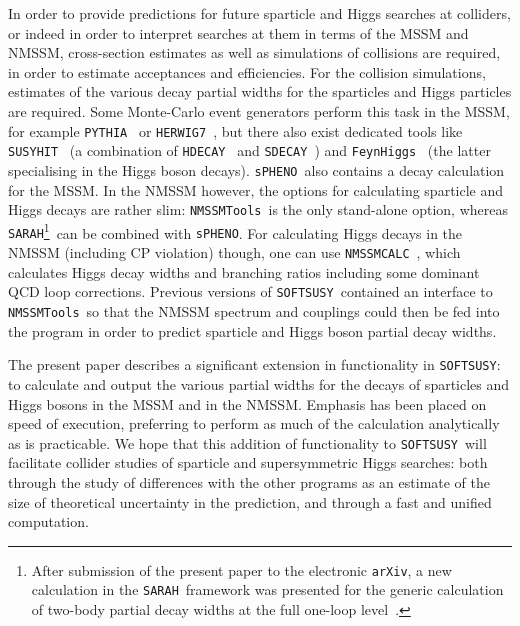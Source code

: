 \documentclass[final,3p,times]{elsarticle}
\def\code#1{{\tt #1}}
\begin{document}
In order to provide predictions for future sparticle and Higgs searches at
colliders, or indeed in order to interpret searches at them in terms 
of the MSSM and NMSSM, cross-section estimates as well as 
simulations of collisions are required, in order to
estimate acceptances and efficiencies. For the collision simulations,
estimates of the 
various decay partial widths for the sparticles and Higgs
particles are required. Some Monte-Carlo event generators perform this task in
the MSSM, for example \code{PYTHIA}~\cite{Sjostrand:2014zea} or
\code{HERWIG7}~\cite{Bahr:2008pv}, but 
there also exist dedicated tools like
\code{SUSYHIT}~\cite{Djouadi:2006bz} (a combination of \code{HDECAY}~\cite{Djouadi:1997yw} and
\code{SDECAY}~\cite{Djouadi:2005}) and
\code{FeynHiggs}~\cite{Heinemeyer:1998yj} (the latter specialising in the 
Higgs boson decays). \code{sPHENO}~also contains a decay
calculation for the MSSM\@. In the NMSSM however, the options for calculating
sparticle and 
Higgs decays are rather slim: \code{NMSSMTools}~is the only stand-alone
option, whereas \code{SARAH}\footnote{After submission of the present paper to
the electronic {\tt arXiv}, a new calculation in the \code{SARAH}~framework
was presented for the generic calculation of two-body partial decay widths at
the full one-loop level~\protect\cite{Goodsell:2017pdq}.}~can be combined with
\code{sPHENO}. For calculating Higgs decays in the NMSSM (including CP
violation) though, one can use \code{NMSSMCALC}~\cite{Baglio:2013iia}, which
calculates 
Higgs decay widths and branching ratios including some dominant QCD loop
corrections. 
Previous 
versions of \code{SOFTSUSY}~contained an interface to 
\code{NMSSMTools}~so that the NMSSM spectrum and couplings could then be fed
into the program in order to predict sparticle and Higgs boson partial decay
widths. 

The present paper describes a significant extension in functionality in
\code{SOFTSUSY}: to calculate and output the various partial widths for the
decays of sparticles and Higgs bosons in the MSSM and in the NMSSM\@. 
Emphasis has been placed on speed of execution, preferring to perform as much
of the calculation analytically as is practicable. 
We hope
that this addition of functionality to \code{SOFTSUSY}~will facilitate
collider studies of sparticle and supersymmetric 
Higgs searches: both through the study of differences with the other programs
as an estimate of the size of theoretical uncertainty in the prediction, and 
through a fast and unified computation. 
\end{document}
